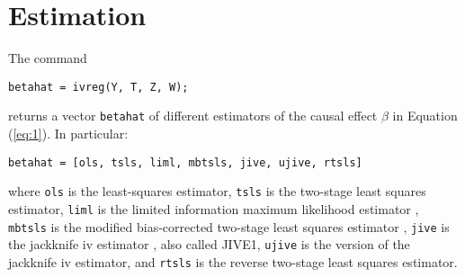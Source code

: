 \documentclass{mynotes}
\begin{document}
\section{Estimation}
The command
\begin{lstlisting}
betahat = ivreg(Y, T, Z, W);
\end{lstlisting}
returns a vector \lstinline!betahat! of different estimators of the causal
effect $\beta$ in Equation (\ref{eq:1}). In particular:
\begin{lstlisting}
betahat = [ols, tsls, liml, mbtsls, jive, ujive, rtsls]
\end{lstlisting}
where \texttt{ols} is the least-squares estimator, \texttt{tsls} is the
two-stage least squares estimator, \texttt{liml} is the limited information
maximum likelihood estimator \citep{ar49}, \texttt{mbtsls} is the modified
bias-corrected two-stage least squares estimator \citep{anatolyev11,kcfgi11},
\texttt{jive} is the jackknife iv estimator \citep{ph77,aik99}, also called
JIVE1, \texttt{ujive} is the \citet{kolesar12late} version of the jackknife iv
estimator, and \texttt{rtsls} is the reverse two-stage least squares estimator.
\end{document}
